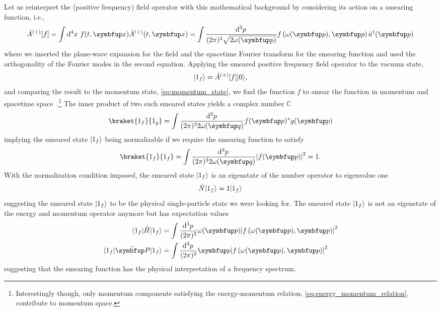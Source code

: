 Let us reinterpret the (positive frequency) field operator with this mathematical background by considering its action on a smearing function, i.e.,
\begin{equation}
	\hat{A}^{(+)}[f]
	=
	\int\dd[4]{x}
	f(t,\vb{x})
	\hat{A}^{(+)}(t,\vb{x})
	=
	\int\frac{\dd[3]{p}}{(2\pi)^3\sqrt{2\omega(\vb{p})}}
	f\left(\omega(\vb{p}),\vb{p}\right)
	\hat{a}^\dagger(\vb{p})
\end{equation}
where we inserted the plane-wave expansion for the field and the spacetime Fourier transform for the smearing function and used the orthogonality of the Fourier modes in the second equation.
Applying the smeared positive frequency field operator to the vacuum state,
\begin{equation}
	\begin{split}
		\lvert1_f\rangle
		=
		\hat{A}^{(+)}[f]
		\lvert0\rangle
		,
	\end{split}
	\label{eq:single_particle_state}
\end{equation}
and comparing the result to the momentum state, \cref{eq:momentum_state}, we find the function $f$ to smear the function in momentum and spacetime space~\cite[p.~35]{Srednicki2007}.\footnote{Interestingly though, only momentum components satisfying the energy-momentum relation, \cref{eq:energy_momentum_relation}, contribute to momentum space.}
The inner product of two such smeared states yields a complex number $\mathbb{C}$
\begin{equation}
	\braket{1_f}{1_g}
	=
	\int\frac{\dd[3]{p}}{(2\pi)^32\omega(\vb{q})}
	f(\vb{p})^*
	g(\vb{p})
\end{equation}
implying the smeared state $\lvert1_f\rangle$ being normalizable if we require the smearing function to satisfy
\begin{equation}
	\braket{1_f}{1_f}
	=
	\int\frac{\dd[3]{p}}{(2\pi)^32\omega(\vb{q})}
	\abs*{f(\vb{p})}^2
	=
	1
	\label{eq:spectrum_normalization}
	.
\end{equation}
With the normalization condition imposed, the smeared state $\lvert1_f\rangle$ is an eigenstate of the number operator to eigenvalue one
\begin{equation}
	\hat{N}
	\lvert1_f\rangle
	=
	1
	\lvert1_f\rangle
\end{equation}
suggesting the smeared state $\lvert1_f\rangle$ to be the physical single-particle state we were looking for.
The smeared state $\lvert1_f\rangle$ is not an eigenstate of the energy and momentum operator anymore but has expectation values
\begin{align}
	\bra{1_f}
	\hat{H}
	\ket{1_f}
	&=
	\int\frac{\dd[3]{p}}{(2\pi)^3}
	\omega(\vb{p})
	\abs*{f\left(\omega(\vb{p}),\vb{p}\right)}^2
	\\
	\bra{1_f}
	\vu{P}
	\ket{1_f}
	&=
	\int\frac{\dd[3]{p}}{(2\pi)^3}
	\vb{p}
	\abs*{f\left(\omega(\vb{p}),\vb{p}\right)}^2
\end{align}
suggesting that the smearing function has the physical interpretation of a frequency spectrum.


